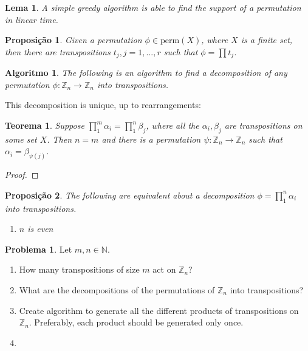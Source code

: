 \documentclass[]{article}
\newtheorem{theorem}{Teorema}[section]
\newtheorem{proposition}{Proposição}[section]
\newtheorem{lemma}{Lema}[section]
\newtheorem{algo}{Algoritmo}[section]
\theoremstyle{definition}
\newtheorem{problem}{Problema}[section]
\theoremstyle{definition}
\newcommand{\raw}{\rightarrow}
\newcommand{\bb}{\mathbb}
\begin{document}
	\begin{lemma}
		A simple greedy algorithm is able to find the support of a permutation in linear time.	
	\end{lemma}
	
	\begin{proposition}
		Given a permutation $\phi \in \text{perm}(X)$, where $X$ is a finite set, then there are transpositions $t_j, j=1,...,r$ such that $\phi = \prod t_j$.
	\end{proposition}
	
	\begin{algo}
		The following is an algorithm to find a decomposition of any permutation $\phi: \bb{Z}_n \raw \bb{Z}_n$ into transpositions.
		
		
		
	\end{algo}
	
	This decomposition is unique, up to rearrangements:
	
	\begin{theorem}
		Suppose $\prod_1^{m}\alpha_i=\prod_{1}^{n}\beta_j$, where all the $\alpha_i, \beta_j$ are transpositions on some set $X$. Then $n=m$ and there is a permutation $\psi:\bb{Z}_n\raw\bb{Z}_n$ such that $\alpha_i = \beta_{\psi(j)}$.
	\end{theorem}
	\begin{proof}
		
	\end{proof}
	
	\begin{proposition}
		The following are equivalent about a decomposition $\phi = \prod_{1}^n\alpha_i$ into transpositions.
		
		\begin{enumerate}
			\item $n$ is even
		\end{enumerate}
	\end{proposition}
	
	\begin{problem}
		Let $m, n \in \bb{N}$.
		\begin{enumerate}
			\item How many transpositions of size $m$ act on $\bb{Z}_n$?
			
			\item 	What are the decompositions of the permutations of $\bb{Z}_n$ into transpositions?
			
			\item Create algorithm to generate all the different products of transpositions on $\bb{Z}_n$. Preferably, each product should be generated only once.
			
			\item  
		\end{enumerate}
		
		
	\end{problem}
	
\end{document}
